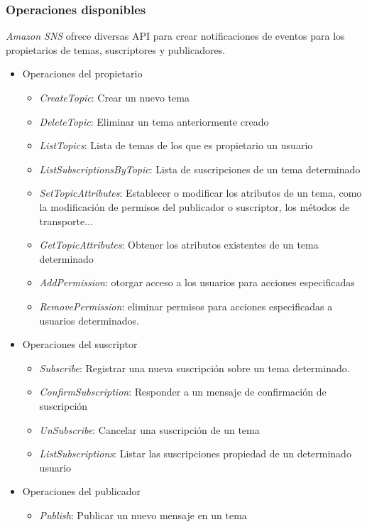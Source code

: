 \documentclass{article}
\begin{document}
\subsubsection{Operaciones disponibles}

	\emph{Amazon SNS} ofrece diversas API para crear notificaciones de eventos para los propietarios de temas, suscriptores y publicadores.
{\setlength{\parskip}{0mm} 
\begin{itemize}
	\item {Operaciones del propietario}
	\begin{itemize}
		\item \textit{CreateTopic}: Crear un nuevo tema
		\item \textit{DeleteTopic}: Eliminar un tema anteriormente creado
		\item \textit{ListTopics}: Lista de temas de los que es propietario un usuario
		\item \textit{ListSubscriptionsByTopic}: Lista de suscripciones de un tema determinado
		\item \textit{SetTopicAttributes}: Establecer o modificar los atributos de un tema, como la modificación de permisos del publicador o suscriptor, los métodos de transporte...
		\item \textit{GetTopicAttributes}: Obtener los atributos existentes de un tema determinado
		\item \textit{AddPermission}: otorgar acceso a los usuarios para acciones especificadas
		\item \textit{RemovePermission}: eliminar permisos para acciones especificadas a usuarios determinados.
	\end{itemize}
	\item {Operaciones del suscriptor}
	\begin{itemize}
		\item \textit{Subscribe}: Registrar una nueva suscripción sobre un tema determinado.
		\item \textit{ConfirmSubscription}: Responder a un mensaje de confirmación de suscripción
		\item \textit{UnSubscribe}: Cancelar una suscripción de un tema
		\item \textit{ListSubscriptions}: Listar las suscripciones propiedad de un determinado usuario
	\end{itemize}
	\item {Operaciones del publicador}
	\begin{itemize}
		\item \textit{Publish}: Publicar un nuevo mensaje en un tema
	\end{itemize}
\end{itemize}
}
\end{document}
